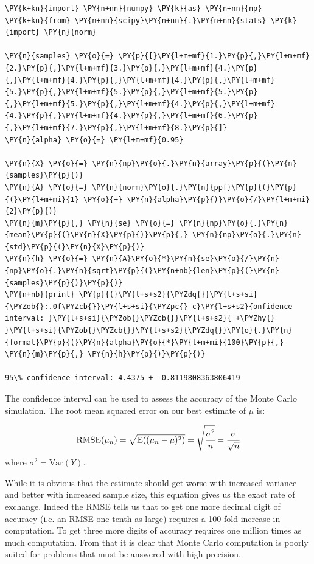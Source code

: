 \begin{tcolorbox}[breakable, size=fbox, boxrule=1pt, pad at break*=1mm,colback=cellbackground, colframe=cellborder]
\begin{Verbatim}[commandchars=\\\{\}]
\PY{k+kn}{import} \PY{n+nn}{numpy} \PY{k}{as} \PY{n+nn}{np}
\PY{k+kn}{from} \PY{n+nn}{scipy}\PY{n+nn}{.}\PY{n+nn}{stats} \PY{k}{import} \PY{n}{norm}
	
\PY{n}{samples} \PY{o}{=} \PY{p}{[}\PY{l+m+mf}{1.}\PY{p}{,}\PY{l+m+mf}{2.}\PY{p}{,}\PY{l+m+mf}{3.}\PY{p}{,}\PY{l+m+mf}{4.}\PY{p}{,}\PY{l+m+mf}{4.}\PY{p}{,}\PY{l+m+mf}{4.}\PY{p}{,}\PY{l+m+mf}{5.}\PY{p}{,}\PY{l+m+mf}{5.}\PY{p}{,}\PY{l+m+mf}{5.}\PY{p}{,}\PY{l+m+mf}{5.}\PY{p}{,}\PY{l+m+mf}{4.}\PY{p}{,}\PY{l+m+mf}{4.}\PY{p}{,}\PY{l+m+mf}{4.}\PY{p}{,}\PY{l+m+mf}{6.}\PY{p}{,}\PY{l+m+mf}{7.}\PY{p}{,}\PY{l+m+mf}{8.}\PY{p}{]}
\PY{n}{alpha} \PY{o}{=} \PY{l+m+mf}{0.95}
	
\PY{n}{X} \PY{o}{=} \PY{n}{np}\PY{o}{.}\PY{n}{array}\PY{p}{(}\PY{n}{samples}\PY{p}{)}
\PY{n}{A} \PY{o}{=} \PY{n}{norm}\PY{o}{.}\PY{n}{ppf}\PY{p}{(}\PY{p}{(}\PY{l+m+mi}{1} \PY{o}{+} \PY{n}{alpha}\PY{p}{)}\PY{o}{/}\PY{l+m+mi}{2}\PY{p}{)}
\PY{n}{m}\PY{p}{,} \PY{n}{se} \PY{o}{=} \PY{n}{np}\PY{o}{.}\PY{n}{mean}\PY{p}{(}\PY{n}{X}\PY{p}{)}\PY{p}{,} \PY{n}{np}\PY{o}{.}\PY{n}{std}\PY{p}{(}\PY{n}{X}\PY{p}{)}
\PY{n}{h} \PY{o}{=} \PY{n}{A}\PY{o}{*}\PY{n}{se}\PY{o}{/}\PY{n}{np}\PY{o}{.}\PY{n}{sqrt}\PY{p}{(}\PY{n+nb}{len}\PY{p}{(}\PY{n}{samples}\PY{p}{)}\PY{p}{)}
\PY{n+nb}{print} \PY{p}{(}\PY{l+s+s2}{\PYZdq{}}\PY{l+s+si}{\PYZob{}:.0f\PYZcb{}}\PY{l+s+si}{\PYZpc{} c}\PY{l+s+s2}{onfidence interval: }\PY{l+s+si}{\PYZob{}\PYZcb{}}\PY{l+s+s2}{ +\PYZhy{} }\PY{l+s+si}{\PYZob{}\PYZcb{}}\PY{l+s+s2}{\PYZdq{}}\PY{o}{.}\PY{n}{format}\PY{p}{(}\PY{n}{alpha}\PY{o}{*}\PY{l+m+mi}{100}\PY{p}{,} \PY{n}{m}\PY{p}{,} \PY{n}{h}\PY{p}{)}\PY{p}{)}
	
95\% confidence interval: 4.4375 +- 0.8119808363806419
\end{Verbatim}
\end{tcolorbox}

The confidence interval can be used to assess the accuracy of the Monte
Carlo simulation. The root mean squared error on our best estimate of
\(\mu\) is:

\[ \mathrm{RMSE}(\mu_n) = \sqrt{\mathbb{E}((\mu_n - \mu )^2)} = \sqrt{\cfrac{\sigma^2}{n}}=\cfrac{\sigma}{\sqrt{n}} \]
where \(\sigma^2 = \mathrm{Var}(Y)\).

While it is obvious that the estimate should get worse with increased variance and better with increased sample size, this equation  gives us the exact rate of exchange. Indeed the RMSE tells us that to get one more decimal digit of accuracy (i.e. an RMSE one tenth as large) requires a 100-fold increase in computation. To get three more digits of accuracy requires one million times as much computation. From that it is clear that Monte Carlo computation is poorly suited for problems that must be answered with high precision.


